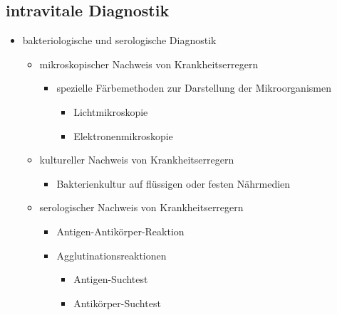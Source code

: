 \subsection{intravitale Diagnostik}
	\begin{itemize}
		\item bakteriologische und serologische Diagnostik
			\begin{itemize}
				\item mikroskopischer Nachweis von Krankheitserregern
					\begin{itemize}
						\item spezielle Färbemethoden zur Darstellung der Mikroorganismen
							\begin{itemize}
								\item Lichtmikroskopie
								\item Elektronenmikroskopie
							\end{itemize}
					\end{itemize}
				\item kultureller Nachweis von Krankheitserregern
					\begin{itemize}
						\item Bakterienkultur auf flüssigen oder festen Nährmedien
					\end{itemize}
				\item serologischer Nachweis von Krankheitserregern
					\begin{itemize}
						\item Antigen-Antikörper-Reaktion
						\item Agglutinationsreaktionen
							\begin{itemize}
								\item Antigen-Suchtest
								\item Antikörper-Suchtest
							\end{itemize}
					\end{itemize}
			\end{itemize}
	\end{itemize}

